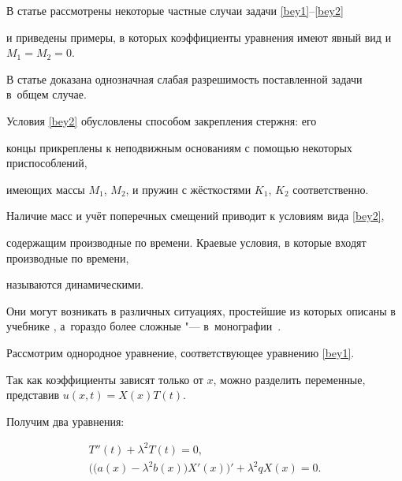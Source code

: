 \smallskip



В статье \cite{FPS} рассмотрены некоторые частные случаи задачи \eqref{bey1}--\eqref{bey2}

и приведены примеры, в которых коэффициенты уравнения имеют явный вид и~$M_1=M_2=0$.

В статье \cite{BP14} доказана однозначная слабая разрешимость поставленной задачи в~общем случае.



Условия \eqref{bey2} обусловлены способом закрепления стержня: его

концы прикреплены к неподвижным основаниям с помощью некоторых приспособлений,

имеющих массы $M_1$, $M_2$, и пружин с жёсткостями $K_1$, $K_2$ соответственно.

Наличие масс и учёт поперечных смещений приводит к условиям вида  \eqref{bey2},

содержащим производные по времени. Краевые условия, в которые входят производные по времени,

называются динамическими. 

Они могут возникать в различных ситуациях, простейшие из которых описаны в учебнике \cite{T-S}, а~гораздо более сложные "--- в~монографии~\cite{korp}.



\smallskip




Рассмотрим однородное уравнение, соответствующее уравнению \eqref{bey1}. 

Так как коэффициенты зависят только от $x$, можно разделить переменные, представив  $u(x,t)=X(x)T(t)$.

Получим два уравнения:

\begin{gather}

T''(t)+\lambda^2T(t)=0,

\\


\label{bey3}

\bigl(\bigl(a(x)-\lambda^2b(x)\bigr)X'(x)\bigr)'+\lambda^2qX(x)=0.


\end{gather}

